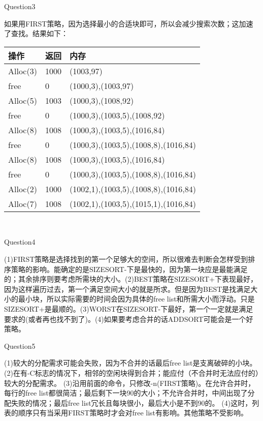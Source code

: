 \documentclass[11pt]{article}
\begin{document}
\begin{large}
	\noindent Question3\\
\end{large}
\hspace*{2em}如果用FIRST策略，因为选择最小的合适块即可，所以会减少搜索次数；这加速了查找。结果如下：\\
\begin{tabular}{p{2cm}p{2cm}p{11cm}}  %
    \toprule[2pt]
    操作 & 返回 & 内存 \\ %
    \midrule[2pt]
    Alloc(3)    & 1000      & (1003,97)      \\
    free        & 0 & (1000,3),(1003,97) \\
    Alloc(5)    & 1003 & (1000,3),(1008,92) \\
    free        & 0 & (1000,3),(1003,5),(1008,92) \\
    Alloc(8)    & 1008 & (1000,3),(1003,5),(1016,84) \\
    free        & 0 & (1000,3),(1003,5),(1008,8),(1016,84) \\
    Alloc(8)    & 1008 & (1000,3),(1003,5),(1016,84) \\
    free        & 0 & (1000,3),(1003,5),(1008,8),(1016,84) \\
    Alloc(2)    & 1000 & (1002,1),(1003,5),(1008,8),(1016,84) \\
    Alloc(7)    & 1008 & (1002,1),(1003,5),(1015,1),(1016,84) \\
    \bottomrule[2pt]
\end{tabular}\\

\begin{large}
	\noindent Question4\\
\end{large}
\hspace*{2em}(1)FIRST策略是选择找到的第一个足够大的空间，所以很难去判断会怎样受到排序策略的影响。能确定的是SIZESORT-下是最快的，因为第一块应是最能满足的；其余排序则要考虑所需块的大小。(2)BEST策略在SIZESORT+下表现最好，因为这样遍历过去，第一个满足空间大小的就是所求。但是因为BEST是找满足大小的最小块，所以实际需要的时间会因为具体的free list和所需大小而浮动。只是SIZESORT+是最顺的。(3)WORST在SIZESORT-下最好，第一个一定就是满足要求的(或者再也找不到了)。(4)如果要考虑合并的话ADDSORT可能会是一个好策略。\\

\begin{large}
	\noindent Question5\\
\end{large}
\hspace*{2em}(1)较大的分配需求可能会失败，因为不合并的话最后free list是支离破碎的小块。(2)在有-C标志的情况下，相邻的空闲块得到合并；能应付（不合并时无法应付的）较大的分配需求。
(3)沿用前面的命令，只修改-n(FIRST策略)。在允许合并时，每行的free list都很简洁；最后剩下一块90的大小；不允许合并时，中间出现了分配失败的情况；最后free list冗长且每块很小，最后大小是不到90的。
(4)这时，列表的顺序只有当采用FIRST策略时才会对free list有影响。其他策略不受影响。\\
\end{document}
